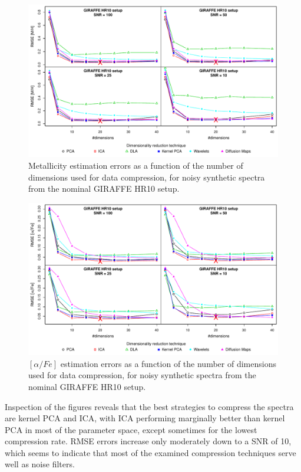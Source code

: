 \documentclass[a4paper,fleqn,usenatbib]{mnras}
\begin{document}
{\begin{figure}
\centering\includegraphics[width=\textwidth]{flamesHR10_Meta_BestSVM_N-RMSE_test.pdf}
\caption{Metallicity estimation errors as a function of the number of
  dimensions used for data compression, for noisy synthetic
  spectra from the nominal GIRAFFE HR10 setup.}
\label{fig:06}
\end{figure}

\begin{figure}
\centering\includegraphics[width=\textwidth]{flamesHR10_AlFe_BestSVM_N-RMSE_test.pdf}
\caption{$\left[ \alpha/Fe \right]$ estimation errors as a function of the number of
  dimensions used for data compression, for noisy synthetic
  spectra from the nominal GIRAFFE HR10 setup.}
\label{fig:07}
\end{figure}

Inspection of the figures reveals that the best strategies to compress
the spectra are kernel PCA and ICA, with ICA performing marginally 
better than kernel PCA in most of the parameter space, except sometimes for the lowest
compression rate. RMSE errors increase only moderately down to a SNR
of 10, which seems to indicate that most of the examined compression
techniques serve well as noise filters.

}
\end{document}
